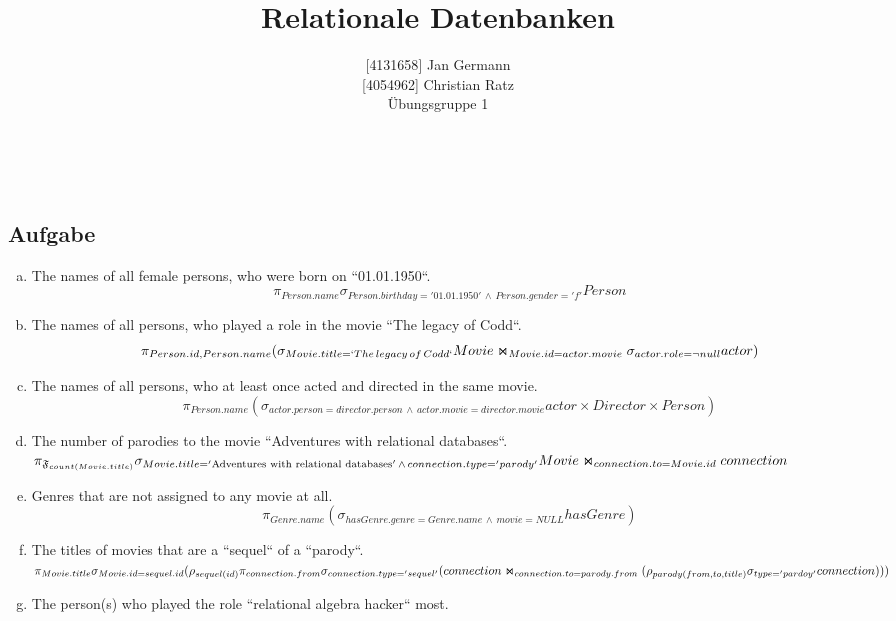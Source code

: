 \documentclass[11pt,a4paper,DIV=9]{scrartcl}
\author{{[}4131658{]} Jan Germann \\{[}4054962{]} Christian Ratz\\Übungsgruppe 1}
\title{Relationale Datenbanken}
\newcounter{temp}
\newcommand{\aufgabe}[1]{
  \setcounter{temp}{\value{subsection}}
  \setcounter{subsection}{#1}
  \addtocounter{subsection}{-1}
  \subsection{Aufgabe}
  \setcounter{subsection}{\value{temp}}
}
\renewcommand{\author}[1]{\renewcommand{\author}{#1}}
\renewcommand{\title}[1]{\renewcommand{\title}{#1}}
\newcommand{\makehomeworktitle}{
  \begin{minipage}[t]{6.5cm}
    \sf{\author}
  \end{minipage}
  \begin{minipage}[t]{6.5cm}
    \begin{flushright}
      \sf{\title\\\today}
    \end{flushright}
  \end{minipage}
  \\[0.2cm]
  \begin{center}
    \sf{
      \color{blue}{
        \LARGE{Aufgabenblatt \blattnr}
      }
    }
  \end{center}
  \vspace{0.1cm}
}
\begin{document}
\makehomeworktitle
\aufgabe{1}
  \begin{enumerate}[a)]
   \item The names of all female persons, who were born on ``01.01.1950``.
    \[ \pi_{Person.name} \sigma_{Person.birthday = '01.01.1950'\,\wedge\,Person.gender = 'f'}Person \]
   \item The names of all persons, who played a role in the movie ``The legacy of Codd``.
    \begin{displaymath} \pi _{Person.id, Person.name} ( \sigma _{Movie.title=`{The\, legacy\, of\, Codd`}} Movie\Join_{Movie.id = actor.movie} \sigma _{actor.role = \neg null} actor)  \end{displaymath}
   \item The names of all persons, who at least once acted and directed in the same movie.
    \begin{displaymath} \pi _{Person.name} (\sigma _{actor.person = director.person \,\wedge\, actor.movie = director.movie} actor \times Director \times Person) \end{displaymath}
   \item The number of parodies to the movie ``Adventures with relational databases``.
    $ \pi_{\mathfrak{F}_{count(Movie.title)}} \\
    \sigma_{Movie.title = '\textrm{Adventures with relational databases}' \,\wedge\, connection.type = 'parody'}\\ Movie\Join_{connection.to = Movie.id}connection $

   \item Genres that are not assigned to any movie at all.
   \begin{displaymath} \pi _{Genre.name} (\sigma _{hasGenre.genre=Genre.name \,\wedge\, movie = NULL} hasGenre) \end{displaymath}
   \item The titles of movies that are a ``sequel`` of a ``parody``. \\
    $\pi_{Movie.title} \\
    \sigma_{Movie.id = sequel.id} \\
    (\rho_{sequel(id)}\\
    \pi_{connection.from}\sigma_{connection.type='sequel'}\\
    (connection \Join_{connection.to = parody.from} \\ 
      (\rho_{parody(from,to,title)}\sigma_{type='pardoy'}connection)\\
    )\\
    )$


   \item The person(s) who played the role ``relational algebra hacker`` most.
  \end{enumerate}
\end{document}
